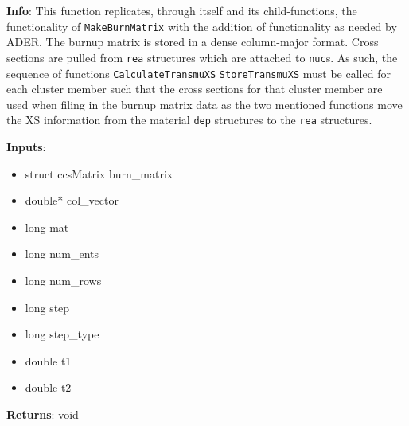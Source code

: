 \textbf{Info}: This function replicates, through itself and its child-functions,
the functionality of \texttt{MakeBurnMatrix} with the addition of functionality
as needed by ADER. The burnup matrix is stored in a dense column-major format. 
Cross sections are pulled from \texttt{rea} structures which are attached to 
\texttt{nuc}s. As such, the sequence of functions \texttt{CalculateTransmuXS}
\texttt{StoreTransmuXS} must be called for each cluster member such that the
cross sections for that cluster member are used when filing in the burnup matrix
data as the two mentioned functions move the XS information from the material
\texttt{dep} structures to the \texttt{rea} structures.

\noindent \textbf{Inputs}:
\begin{itemize}
\item{struct ccsMatrix burn\_matrix}
\item{double* col\_vector}
\item{long mat}
\item{long num\_ents}
\item{long num\_rows}
\item{long step}
\item{long step\_type}
\item{double t1}
\item{double t2}
\end{itemize}

\noindent \textbf{Returns}: void
